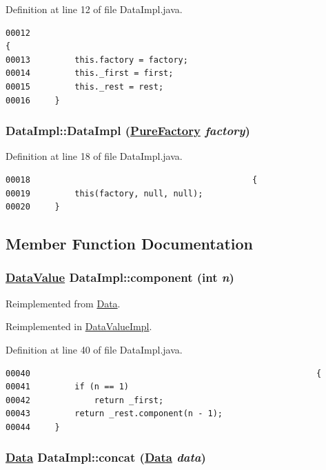 Definition at line 12 of file Data\-Impl.java.\footnotesize\begin{verbatim}00012                                                                         {
00013         this.factory = factory;
00014         this._first = first;
00015         this._rest = rest;
00016     }
\end{verbatim}\normalsize 
\hypertarget{classDataImpl_b1}{
\subsubsection[DataImpl]{\setlength{\rightskip}{0pt plus 5cm}Data\-Impl::Data\-Impl (\hyperlink{classPureFactory}{Pure\-Factory} {\em factory})}}
\label{classDataImpl_b1}




Definition at line 18 of file Data\-Impl.java.\footnotesize\begin{verbatim}00018                                             {
00019         this(factory, null, null);
00020     }
\end{verbatim}\normalsize 


\subsection{Member Function Documentation}
\hypertarget{classDataImpl_a4}{
\subsubsection[component]{\setlength{\rightskip}{0pt plus 5cm}\hyperlink{interfaceDataValue}{Data\-Value} Data\-Impl::component (int {\em n})}}
\label{classDataImpl_a4}




Reimplemented from \hyperlink{interfaceData_a4}{Data}.

Reimplemented in \hyperlink{classDataValueImpl_a4}{Data\-Value\-Impl}.

Definition at line 40 of file Data\-Impl.java.\footnotesize\begin{verbatim}00040                                                          {
00041         if (n == 1) 
00042             return _first;
00043         return _rest.component(n - 1);
00044     }
\end{verbatim}\normalsize 
\hypertarget{classDataImpl_a0}{
\subsubsection[concat]{\setlength{\rightskip}{0pt plus 5cm}\hyperlink{interfaceData}{Data} Data\-Impl::concat (\hyperlink{interfaceData}{Data} {\em data})}}
\label{classDataImpl_a0}




